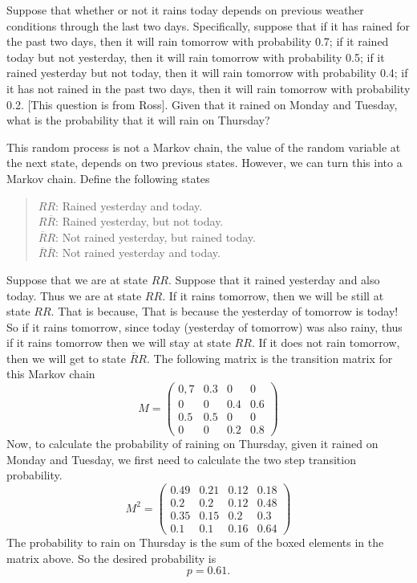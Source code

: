 \begin{example}
	Suppose that whether or not it rains today depends on previous weather conditions through the last two days. Specifically, suppose that if it has rained for the past two days, then it will rain tomorrow with probability 0.7; if it rained today but not yesterday, then it will rain tomorrow with probability 0.5; if it rained yesterday but not today, then it will rain tomorrow with probability 0.4; if it has not rained in the past two days, then it will rain tomorrow with probability 0.2. [This question is from Ross]. Given that it rained on Monday and Tuesday, what is the probability that it will rain on Thursday?
	\begin{solution}
		This random process is not a Markov chain, the value of the random variable at the next state, depends on two previous states. However, we can turn this into a Markov chain. Define the following states
		\begin{quote}
			$RR$: Rained yesterday and today.\\
			$R\overline{R}$: Rained yesterday, but not today.\\
			$\overline{R}R$: Not rained yesterday, but rained today.\\
			$\overline{R}\overline{R}$: Not rained yesterday and today.
		\end{quote}
		Suppose that we are at state $RR$. Suppose that it rained yesterday and also today. Thus we are at state $RR$. If it rains tomorrow, then we will be still at state $RR$. That is because, That is because the yesterday of tomorrow is today! So if it rains tomorrow, since today (yesterday of tomorrow) was also rainy, thus if it rains tomorrow then we will stay at state $RR$. If it does not rain tomorrow, then we will get to state $\overline{R}R$. The following matrix is the transition matrix for this Markov chain
		\[M = \begin{pmatrix}
			0,7 & 0.3 & 0 & 0 \\
			0 & 0 & 0.4 & 0.6 \\
			0.5 & 0.5 & 0 & 0 \\
			0 & 0 & 0.2 & 0.8
		\end{pmatrix}\]
		Now, to calculate the probability of raining on Thursday, given it rained on Monday and Tuesday, we first need to calculate the two step transition probability.
		\[
		M^2 = \begin{pmatrix}
			\boxed{0.49} & 0.21 & \boxed{0.12} & 0.18 \\
			0.2  & 0.2  & 0.12 & 0.48 \\
			0.35 & 0.15 & 0.2  & 0.3  \\
			0.1  & 0.1  & 0.16 & 0.64
		\end{pmatrix}
		\]
		The probability to rain on Thursday is the sum of the boxed elements in the matrix above. So the desired probability is 
		\[ p = 0.61. \]
	\end{solution}
	
\end{example}



